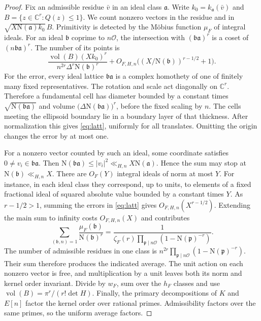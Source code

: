 \documentclass[11pt,letterpaper]{amsart}
\theoremstyle{definition}
\numberwithin{equation}{section}
\newcommand{\C}{\mathbb C}
\newcommand{\OO}{\mathcal O}
\newcommand{\NN}{\mathrm N}
\newcommand{\vol}{\operatorname{vol}}
\newcommand{\abs}[1]{\lvert #1\rvert}
\begin{document}
\begin{proof}
Fix an admissible residue \(\bar v\) in an ideal class
\(\mathfrak a\). Write \(k_0=k_{\mathfrak a}(\bar v)\) and
\(B=\{z\in\C^r:Q(z)\le1\}\). We count nonzero vectors in the residue
and in \(\sqrt{X\NN(\mathfrak a)k_0}\,B\). Primitivity is detected by
the M\"obius function \(\mu_F\) of integral ideals. For an ideal
\(\mathfrak b\) coprime to \(n\OO\), the intersection with
\((\mathfrak b\mathfrak a)^r\) is a coset of
\((n\mathfrak b\mathfrak a)^r\). The number of its points is
\begin{equation}\label{eq:latt}
 \frac{\vol(B)(Xk_0)^r}{n^{2r}\Delta^r\NN(\mathfrak b)^r}
       +O_{F,H,n}\bigl((X/\NN(\mathfrak b))^{r-1/2}+1\bigr).
\end{equation}
For the error, every ideal lattice \(\mathfrak b\mathfrak a\) is a
complex homothety of one of finitely many fixed representatives.
The rotation and scale act diagonally on \(\C^r\). Therefore a
fundamental cell has diameter bounded by a constant times
\(\sqrt{\NN(\mathfrak b\mathfrak a)}\) and volume
\(\bigl(\Delta\NN(\mathfrak b\mathfrak a)\bigr)^r\), before the fixed
scaling by \(n\). The cells meeting the ellipsoid boundary lie in a
boundary layer of that thickness. After normalization this gives
\eqref{eq:latt}, uniformly for all translates. Omitting the origin
changes the error by at most one.

For a nonzero vector counted by such an ideal, some coordinate
satisfies \(0\ne v_i\in\mathfrak b\mathfrak a\).
Then \(\NN(\mathfrak b\mathfrak a)\le\abs{v_i}^2\ll_{H,n}X\NN(\mathfrak a)\).
Hence the sum may stop at \(\NN(\mathfrak b)\ll_{H,n}X\).
There are \(O_F(Y)\) integral ideals of norm at most \(Y\).
For instance, in each ideal class they correspond, up to units, to
elements of a fixed fractional ideal of squared absolute value
bounded by a constant times \(Y\).
As \(r-1/2>1\), summing the errors in \eqref{eq:latt} gives
\(O_{F,H,n}(X^{r-1/2})\). Extending the main sum to infinity costs
\(O_{F,H,n}(X)\) and contributes
\[
 \sum_{(\mathfrak b,n)=1}\frac{\mu_F(\mathfrak b)}{\NN(\mathfrak b)^r}
 =
 \frac{1}{\zeta_F(r)\prod_{\mathfrak p\mid n\OO}(1-\NN(\mathfrak p)^{-r})}.
\]
The number of admissible residues in one class is
\(n^{2r}\prod_{\mathfrak p\mid n\OO}(1-\NN(\mathfrak p)^{-r})\).
Their sum therefore produces the indicated average. The unit action
on each nonzero vector is free, and multiplication by a unit leaves
both its norm and kernel order invariant. Divide by \(w_F\), sum
over the \(h_F\) classes and use
\(\vol(B)=\pi^r/(r!\det H)\). Finally, the primary decompositions of
\(K\) and \(E[n]\) factor the kernel order over rational primes.
Admissibility factors over the same primes, so the uniform average
factors.
\end{proof}
\end{document}

